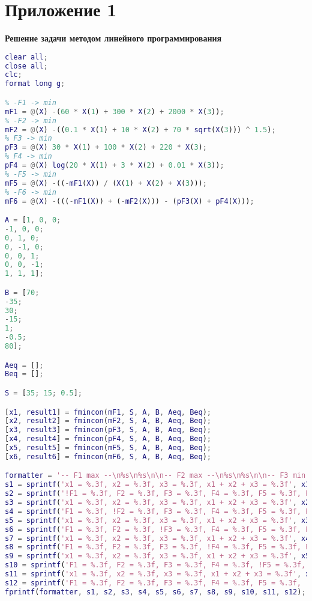 \section*{Приложение 1} \label{p1:1}
\textbf{Решение задачи методом линейного программирования}
\begin{lstlisting}[language={matlab}, caption={Решение задачи методом линейного программирования}, label={lst:0}, basicstyle={\footnotesize\ttfamily}, breaklines={true}]
clear all;
close all; 
clc;
format long g;

% -F1 -> min
mF1 = @(X) -(60 * X(1) + 300 * X(2) + 2000 * X(3));
% -F2 -> min
mF2 = @(X) -((0.1 * X(1) + 10 * X(2) + 70 * sqrt(X(3))) ^ 1.5);
% F3 -> min
pF3 = @(X) 30 * X(1) + 100 * X(2) + 220 * X(3);
% F4 -> min
pF4 = @(X) log(20 * X(1) + 3 * X(2) + 0.01 * X(3));
% -F5 -> min
mF5 = @(X) -((-mF1(X)) / (X(1) + X(2) + X(3)));
% -F6 -> min
mF6 = @(X) -(((-mF1(X)) + (-mF2(X))) - (pF3(X) + pF4(X)));

A = [1, 0, 0;
-1, 0, 0;
0, 1, 0;
0, -1, 0;
0, 0, 1;
0, 0, -1;
1, 1, 1];

B = [70;
-35;
30;
-15;
1;
-0.5;
80];

Aeq = [];
Beq = [];

S = [35; 15; 0.5];

[x1, result1] = fmincon(mF1, S, A, B, Aeq, Beq);
[x2, result2] = fmincon(mF2, S, A, B, Aeq, Beq);
[x3, result3] = fmincon(pF3, S, A, B, Aeq, Beq);
[x4, result4] = fmincon(pF4, S, A, B, Aeq, Beq);
[x5, result5] = fmincon(mF5, S, A, B, Aeq, Beq);
[x6, result6] = fmincon(mF6, S, A, B, Aeq, Beq);

formatter = '-- F1 max --\n%s\n%s\n\n-- F2 max --\n%s\n%s\n\n-- F3 min --\n%s\n%s\n\n-- F4 min --\n%s\n%s\n\n-- F5 max --\n%s\n%s\n\n-- F6 max --\n%s\n%s\n\n';
s1 = sprintf('x1 = %.3f, x2 = %.3f, x3 = %.3f, x1 + x2 + x3 = %.3f', x1, sum(x1));
s2 = sprintf('!F1 = %.3f, F2 = %.3f, F3 = %.3f, F4 = %.3f, F5 = %.3f, F6 = %.3f', -result1, -mF2(x1), pF3(x1), pF4(x1), -mF5(x1), -mF6(x1));
s3 = sprintf('x1 = %.3f, x2 = %.3f, x3 = %.3f, x1 + x2 + x3 = %.3f', x2, sum(x2));
s4 = sprintf('F1 = %.3f, !F2 = %.3f, F3 = %.3f, F4 = %.3f, F5 = %.3f, F6 = %.3f', -mF1(x2), -result2, pF3(x2), pF4(x2), -mF5(x2), -mF6(x2)); 
s5 = sprintf('x1 = %.3f, x2 = %.3f, x3 = %.3f, x1 + x2 + x3 = %.3f', x3, sum(x3));
s6 = sprintf('F1 = %.3f, F2 = %.3f, !F3 = %.3f, F4 = %.3f, F5 = %.3f, F6 = %.3f', -mF1(x3), -mF2(x3), result3, pF4(x3), -mF5(x3), -mF6(x3)); 
s7 = sprintf('x1 = %.3f, x2 = %.3f, x3 = %.3f, x1 + x2 + x3 = %.3f', x4, sum(x4));
s8 = sprintf('F1 = %.3f, F2 = %.3f, F3 = %.3f, !F4 = %.3f, F5 = %.3f, F6 = %.3f', -mF1(x4), -mF2(x4), pF3(x4), result4, -mF5(x4), -mF6(x4));
s9 = sprintf('x1 = %.3f, x2 = %.3f, x3 = %.3f, x1 + x2 + x3 = %.3f', x5, sum(x5));
s10 = sprintf('F1 = %.3f, F2 = %.3f, F3 = %.3f, F4 = %.3f, !F5 = %.3f, F6 = %.3f', -mF1(x5), -mF2(x5), pF3(x5), pF4(x5), -result5, -mF6(x5)); 
s11 = sprintf('x1 = %.3f, x2 = %.3f, x3 = %.3f, x1 + x2 + x3 = %.3f', x6, sum(x6));
s12 = sprintf('F1 = %.3f, F2 = %.3f, F3 = %.3f, F4 = %.3f, F5 = %.3f, !F6 = %.3f', -mF1(x6), -mF2(x6), pF3(x6), pF4(x6), -mF5(x6), -result6);
fprintf(formatter, s1, s2, s3, s4, s5, s6, s7, s8, s9, s10, s11, s12);
\end{lstlisting}

